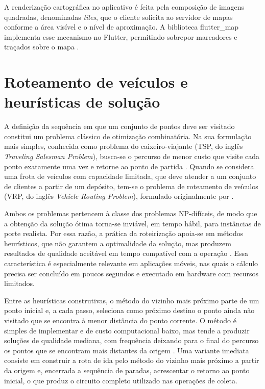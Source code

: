 A renderização cartográfica no aplicativo é feita pela composição de imagens quadradas, denominadas \textit{tiles}, que o cliente solicita ao servidor de mapas conforme a área visível e o nível de aproximação. A biblioteca flutter\_map implementa esse mecanismo no Flutter, permitindo sobrepor marcadores e traçados sobre o mapa \cite{fluttermap2024}.

\section{Roteamento de veículos e heurísticas de solução}

A definição da sequência em que um conjunto de pontos deve ser visitado constitui um problema clássico de otimização combinatória. Na sua formulação mais simples, conhecida como problema do caixeiro-viajante (TSP, do inglês \textit{Traveling Salesman Problem}), busca-se o percurso de menor custo que visite cada ponto exatamente uma vez e retorne ao ponto de partida \cite{cormen2012}. Quando se considera uma frota de veículos com capacidade limitada, que deve atender a um conjunto de clientes a partir de um depósito, tem-se o problema de roteamento de veículos (VRP, do inglês \textit{Vehicle Routing Problem}), formulado originalmente por .

Ambos os problemas pertencem à classe dos problemas NP-difíceis, de modo que a obtenção da solução ótima torna-se inviável, em tempo hábil, para instâncias de porte realista. Por essa razão, a prática da roteirização apoia-se em métodos heurísticos, que não garantem a optimalidade da solução, mas produzem resultados de qualidade aceitável em tempo compatível com a operação \cite{cunha2000}. Essa característica é especialmente relevante em aplicações móveis, nas quais o cálculo precisa ser concluído em poucos segundos e executado em hardware com recursos limitados.

Entre as heurísticas construtivas, o método do vizinho mais próximo parte de um ponto inicial e, a cada passo, seleciona como próximo destino o ponto ainda não visitado que se encontra à menor distância do ponto corrente. O método é simples de implementar e de custo computacional baixo, mas tende a produzir soluções de qualidade mediana, com frequência deixando para o final do percurso os pontos que se encontram mais distantes da origem \cite{cormen2012}. Uma variante imediata consiste em construir a rota de ida pelo método do vizinho mais próximo a partir da origem e, encerrada a sequência de paradas, acrescentar o retorno ao ponto inicial, o que produz o circuito completo utilizado nas operações de coleta.

